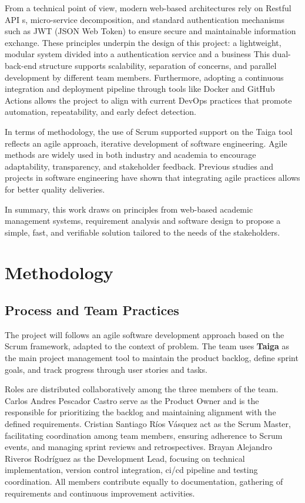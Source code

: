 \documentclass[12pt,a4paper]{article}
\begin{document}
From a technical point of view, modern web-based architectures rely on Restful API s, micro-service decomposition, and standard authentication mechanisms such as JWT (JSON Web Token) to ensure secure and maintainable information exchange. These principles underpin the design of this project: a lightweight, modular system divided into a authentication service and a business  This dual-back-end structure supports scalability, separation of concerns, and parallel development by different team members. Furthermore, adopting a continuous integration and deployment pipeline through tools like Docker and GitHub Actions allows the project to align with current DevOps practices that promote automation, repeatability, and early defect detection.\newline

In terms of methodology, the use of Scrum supported support on the Taiga tool reflects an agile approach, iterative development of software engineering. Agile methods are widely used in both industry and academia to encourage adaptability, transparency, and stakeholder feedback. Previous studies and projects in software engineering have shown that integrating agile practices allows for better quality deliveries.\newline

In summary, this work draws on principles from web-based academic management systems, requirement analysis and software design to propose a simple, fast, and verifiable solution tailored to the needs of the stakeholders.


\section{Methodology}
\label{sec:method}

\subsection{Process and Team Practices}
The project will follows an agile software development approach based on the Scrum framework, adapted to the context of problem. The team uses \textbf{Taiga} as the main project management tool to maintain the product backlog, define sprint goals, and track progress through user stories and tasks.\newline

Roles are distributed collaboratively among the three members of the team. Carlos Andres Pescador Castro serve as the Product Owner and is the responsible for prioritizing the backlog and maintaining alignment with the defined requirements. Cristian Santiago Ríos Vásquez act as the Scrum Master, facilitating coordination among team members, ensuring adherence to Scrum events, and managing sprint reviews and retrospectives. Brayan Alejandro Riveros Rodríguez as the Development Lead, focusing on technical implementation, version control integration, ci/cd pipeline and testing coordination. All members contribute equally to documentation, gathering of requirements and continuous improvement activities.\newline
\end{document}
